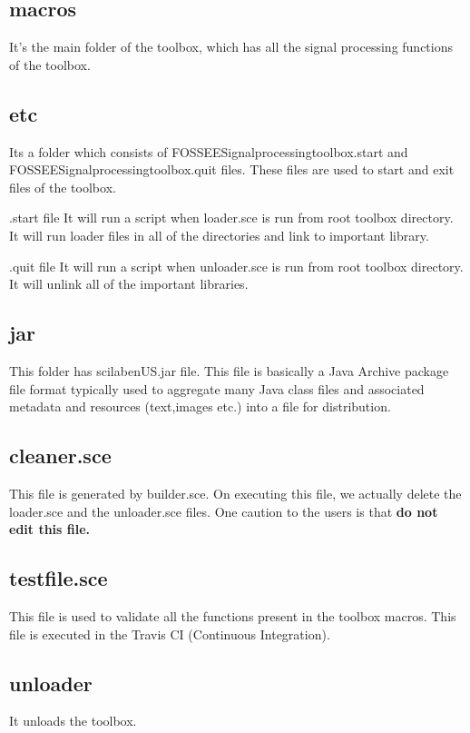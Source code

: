 \documentclass[12pt,a4paper]{report}
\begin{document}
\subsection{macros}
It’s the main folder of the toolbox, which has all the signal processing functions of the toolbox.

\subsection{etc}
Its a folder which consists of FOSSEE\textunderscore Signal\textunderscore processing\textunderscore toolbox.start and FOSSEE\textunderscore Signal\textunderscore processing\textunderscore toolbox.quit files.
These files are used to start and exit files of the toolbox.

.start file
It will run a script when loader.sce is run from root toolbox directory. It will run loader files in all of the directories and link to important library.

.quit file
It will run a script when unloader.sce is run from root toolbox directory. It will unlink all of the important libraries.


\subsection{jar}
This folder has scilab\textunderscore en\textunderscore US.jar file. This file is basically a Java Archive package file format typically used to aggregate many Java class files and associated metadata and resources (text,images etc.) into a file for distribution.

\subsection{cleaner.sce}
This file is generated by builder.sce. On executing this file, we actually delete the loader.sce and the unloader.sce files.
One caution to the users is that  \textbf{do not edit this file.}

\subsection{testfile.sce}
This file is used to validate all the functions present in the toolbox macros. This file is executed in the Travis CI (Continuous Integration).

\subsection{unloader}
It unloads the toolbox.
\end{document}
